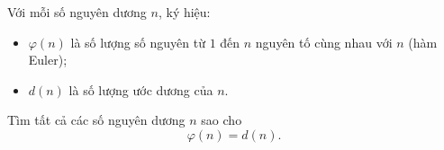 \ifshowproblem
\begin{problem}\label{example:JPN-2015-EGMO-TST-P4}
	Với mỗi số nguyên dương $n$, ký hiệu:
	\begin{itemize}[topsep=0pt, partopsep=0pt, itemsep=0pt]
		\item $\varphi(n)$ là số lượng số nguyên từ $1$ đến $n$ nguyên tố cùng nhau với $n$ (hàm Euler);
		\item $d(n)$ là số lượng ước dương của $n$.
	\end{itemize}
	
	Tìm tất cả các số nguyên dương $n$ sao cho
	\[
		\varphi(n) = d(n).
	\]
\end{problem}
\fi

\fi